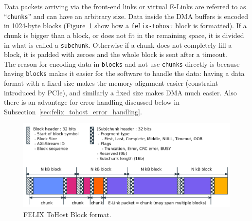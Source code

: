 Data packets arriving via the front-end links or virtual E-Links are referred to as “\texttt{chunks}” and can have an arbitrary size. Data inside the \acs{DMA} buffers is encoded in 1024-byte blocks (Figure~\ref{fig:block-format} show how a \texttt{felix-tohost} block is formatted). If a chunk is bigger than a block, or does not fit in the remaining space, it is divided in what is called a \texttt{subchunk}. Otherwise if a chunk does not completely fill a block, it is padded with zeroes and the whole block is sent after a timeout.\\
The reason for encoding data in \texttt{blocks} and not use \texttt{chunks} directly is because having \texttt{blocks} makes it easier for the software to handle the data: having a data format with a fixed size makes the memory alignment easier (constraint introduced by \acs{PCIe}), and similarly a fixed size makes \acs{DMA} much easier. Also there is an advantage for error handling discussed below in Subsection~\ref{sec:felix_tohost_error_handling}.

\begin{figure}[htbp]
\centering
\includegraphics[width=\textwidth]{images/felix/block-data-format.png}
\caption[ToHost Block data format]{\acs{FELIX} ToHost Block format.}
\label{fig:block-format}
\end{figure}

